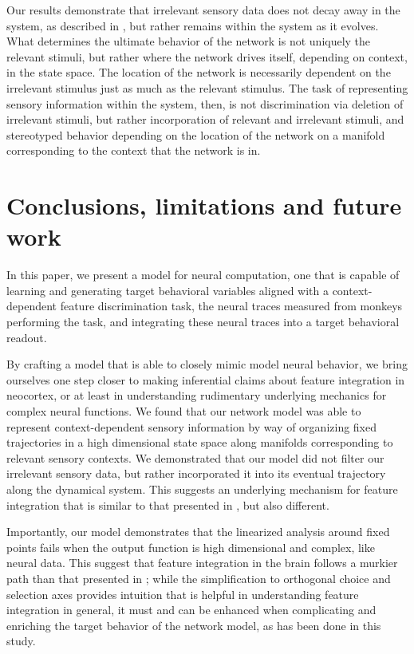 \documentclass[12pt,a4paper,final]{iopart}
\begin{document}
Our results demonstrate that irrelevant sensory data does not decay away in the system, as described in \cite{BarakSussillo}, but rather remains within the system as it evolves. What determines the ultimate behavior of the network is not uniquely the relevant stimuli, but rather where the network drives itself, depending on context, in the state space. The location of the network is necessarily dependent on the irrelevant stimulus just as much as the relevant stimulus. The task of representing sensory information within the system, then, is not discrimination via deletion of irrelevant stimuli, but rather incorporation of relevant and irrelevant stimuli, and stereotyped behavior depending on the location of the network on a manifold corresponding to the context that the network is in.

\section{Conclusions, limitations and future work}
\label{sec:con}
In this paper, we present a model for neural computation, one that is capable of learning and generating target behavioral variables aligned with a context-dependent feature discrimination task, the neural traces measured from monkeys performing the task, and integrating these neural traces into a target behavioral readout. 

By crafting a model that is able to closely mimic model neural behavior, we bring ourselves one step closer to making inferential claims about feature integration in neocortex, or at least in understanding rudimentary underlying mechanics for complex neural functions. We found that our network model was able to represent context-dependent sensory information by way of organizing fixed trajectories in a high dimensional state space along manifolds corresponding to relevant sensory contexts. We demonstrated that our model did not filter our irrelevant sensory data, but rather incorporated it into its eventual trajectory along the dynamical system. This suggests an underlying mechanism for feature integration that is similar to that presented in \cite{Mante2013}, but also different. 

Importantly, our model demonstrates that the linearized analysis around fixed points fails when the output function is high dimensional and complex, like neural data. This suggest that feature integration in the brain follows a murkier path than that presented in \cite{Mante2013}; while the simplification to orthogonal choice and selection axes provides intuition that is helpful in understanding feature integration in general, it must and can be enhanced when complicating and enriching the target behavior of the network model, as has been done in this study.
\end{document}
